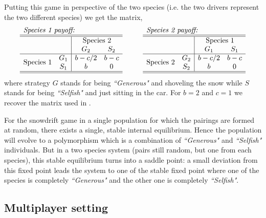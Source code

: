 \documentclass[12pt]{article}
\begin{document}
\begin{appendices}
Putting this game in perspective of the two species (i.e. the two drivers represent the two different species) we get the matrix,\\
%
\begin{equation}\label{}
\begin{array}{cc|cc}
\multicolumn{4}{l}{\textit{Species 1 payoff:}} \\
\hline\hline
& & \multicolumn{2}{c}{\text{Species 2}}\\
&	&	G_2		&	S_2	\\
\hline
 \multirow{2}{*}{Species 1} & G_1 	& b-c/2 &	b-c \\
&	S_1	&  b & 0 \\
 \hline\hline
\end{array}
\hspace{1cm}
\begin{array}{cc|cc}
\multicolumn{4}{l}{\textit{Species 2 payoff:}} \\
\hline\hline
& & \multicolumn{2}{c}{\text{Species 1}}\\
&	&	G_1		&	S_1	\\
\hline
 \multirow{2}{*}{Species 2} & G_2 	& b-c/2 &	b-c \\
&	S_2	& b & 0  \\
 \hline\hline
\end{array}
\end{equation}
%
where strategy $G$ stands for being \textit{``Generous"} and shoveling the snow while $S$ stands for being \textit{``Selfish"} and just sitting in the car.
For $b=2$ and $c=1$ we recover the matrix used in \citep{bergstrom:PNAS:2003}.

For the snowdrift game in a single population for which the pairings are formed at random, there exists a single, stable internal equilibrium.
Hence the population will evolve to a polymorphism which is a combination of \textit{``Generous"} and \textit{``Selfish"} individuals.
But in a two species system (pairs still random, but one from each species), this stable equilibrium turns into a saddle point: a small deviation from this fixed point leads the system to one of the stable fixed point where one of the species is completely \textit{``Generous"} and the other one is completely \textit{``Selfish"}.

\subsection*{Multiplayer setting}
\label{appB}


\end{appendices}
\end{document}
